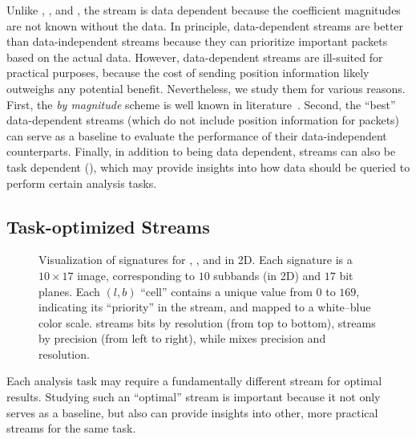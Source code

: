 Unlike \slvl, \sbit, and \swav, the \smag stream is data dependent because the coefficient
magnitudes are not known without the data.
%
In principle, data-dependent streams are better than data-independent streams because they can
prioritize important packets based on the actual data. However, data-dependent streams are
ill-suited for practical purposes, because the cost of sending position information likely outweighs
any potential benefit. Nevertheless, we study them for various reasons. First, the \emph{by
magnitude} scheme is well known in literature~\cite{vapor2007}. Second, the ``best'' data-dependent
streams (which do not include position information for packets) can serve as a baseline to evaluate
the performance of their data-independent counterparts. Finally, in addition to being data
dependent, streams can also be task dependent (), which may provide
insights into how data should be queried to perform certain analysis tasks.

\subsection{Task-optimized Streams} \label{sec:data_dep_streams}
\begin{figure}[t]
\centering
\caption{Visualization of signatures for \slvl, \sbit, and \swav in 2D. Each signature is a
$10\times 17$ image, corresponding to $10$ subbands (in 2D) and $17$ bit planes. Each $(l,b)$
``cell'' contains a unique value from $0$ to $169$, indicating its ``priority'' in the stream, and
mapped to a white--blue color scale. \slvl streams bits by resolution (from top to bottom), \sbit
streams by precision (from left to right), while \swav mixes precision and resolution.}
\label{fig:example-signatures}
\vspace{-1em}
\end{figure}


Each analysis task may require a fundamentally different stream for optimal results. Studying such
an ``optimal'' stream is important because it not only serves as a baseline,
but also can provide insights into other, more practical streams for the same task.

